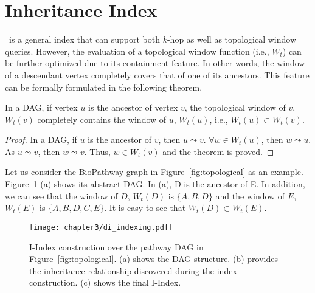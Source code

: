 \section{Inheritance Index}\label{gw:sec:topo}
\DBIndex\ is a general index that can support both $k$-hop as well as
topological window queries. 
However, the evaluation of a topological window function (i.e., $W_t$)
can be further optimized due to its containment feature. 
In other words, the window of a descendant vertex 
completely covers that of one of its ancestors. 
This feature can be formally formulated in the following theorem. 

\begin{theorem}
\label{thm:containment}
In a DAG, if vertex $u$ is the ancestor of vertex $v$, the topological window of $v$, $W_t(v)$ completely contains the window of $u$, $W_t(u)$, i.e., $W_t(u) \subset W_t(v)$.   
\end{theorem}

\begin{proof}
In a DAG, if $u$ is the ancestor of $v$, then $u \leadsto v$. $\forall w \in W_t(u)$, then $w \leadsto u$. As $u \leadsto v$, then $w \leadsto v$. Thus, $w \in W_t(v)$ and the theorem is proved.   
\end{proof}

Let us consider the BioPathway graph in Figure~\ref{fig:topological} as
an example.
Figure~\ref{fig:diff-index} (a) shows its abstract DAG. In (a), 
D is the ancestor of E. In addition, we can see that the window of $D$, 
$W_t(D)$ is $\{A, B, D\}$ and the window of $E$, $W_t(E)$ is $\{A, B, D, C, E\}$. It is easy to see that $W_t(D) \subset W_t(E)$. 

\begin{figure}[t]
\centering
\texttt{[image: chapter3/di\_indexing.pdf]}
	\caption{I-Index construction over the pathway DAG in Figure~\ref{fig:topological}. (a) shows the DAG structure. (b) provides the inheritance relationship discovered during the index construction. (c) shows the final I-Index.}
	\label{fig:diff-index}
\end{figure}

